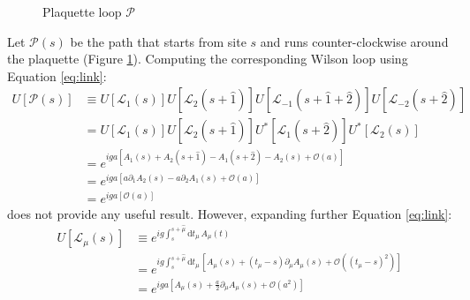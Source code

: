 \begin{figure}[!htb]
    \centering
    \caption{Plaquette loop $\mathcal P$}
    \label{fig:plaq}
\end{figure}
Let $\mathcal P(s)$ be the path that starts from site $s$ and runs counter-clockwise around the plaquette (Figure \ref{fig:plaq}).
Computing the corresponding Wilson loop using Equation \eqref{eq:link}:
\begin{equation*}
    \begin{aligned}
        U[\mathcal P(s)] &\equiv U[\mathcal L_{1}(s)] U[\mathcal L_{2}(s+\hat 1)] U[\mathcal L_{-1}(s+\hat 1+\hat 2)] U[\mathcal L_{-2}(s+\hat 2)] \\
                              &= U[\mathcal L_{1}(s)] U[\mathcal L_{2}(s+\hat 1)] U^*[\mathcal L_{1}(s+\hat 2)] U^*[\mathcal L_{2}(s)] \\
                              &= e^{iga[A_1(s) + A_2(s+\hat 1) - A_1(s+\hat 2) - A_2(s) + \mathcal O\left(a\right)]} \\
                              &= e^{iga[a\partial_1A_2(s) - a\partial_2A_1(s) + \mathcal O\left(a\right)]} \\
                              &= e^{iga\left[\mathcal O\left(a\right)\right]}
    \end{aligned}
\end{equation*}
does not provide any useful result. However, expanding further Equation \eqref{eq:link}:
\begin{equation*}%
    \begin{aligned}
        U[\mathcal L_{\mu}(s)] &\equiv e^{ig\int_s^{s+\hat\mu}\mathrm dt_\mu\,A_\mu(t)} \\
                       &= e^{ig\int_s^{s+\hat\mu}\mathrm dt_\mu\,\left[A_\mu(s) + (t_\mu-s)\partial_\mu A_\mu(s) + \mathcal O\left((t_\mu-s)^2\right)\right]} \\
                       &= e^{iga\left[A_\mu(s) + \frac{a}{2}\partial_\mu A_\mu(s) + \mathcal O\left(a^2\right)\right]} \\
    \end{aligned}
\end{equation*}
